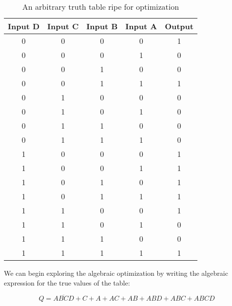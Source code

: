     \begin{table}
        \begin{tabular}{c c c c | c}
            \toprule
            Input D & Input C & Input B & Input A & Output \\
            \midrule
                0    &    0     &    0     &    0     &    1    \\
                0    &    0     &    0     &    1     &    0    \\
                0    &    0     &    1     &    0     &    0    \\
                0    &    0     &    1     &    1     &    1    \\
                0    &    1     &    0     &    0     &    0    \\
                0    &    1     &    0     &    1     &    0    \\
                0    &    1     &    1     &    0     &    0    \\
                0    &    1     &    1     &    1     &    0    \\
                1    &    0     &    0     &    0     &    1    \\
                1    &    0     &    0     &    1     &    1    \\
                1    &    0     &    1     &    0     &    1    \\
                1    &    0     &    1     &    1     &    1    \\
                1    &    1     &    0     &    0     &    1    \\
                1    &    1     &    0     &    1     &    0    \\
                1    &    1     &    1     &    0     &    0    \\
                1    &    1     &    1     &    1     &    1    \\
            \bottomrule
        \end{tabular}
        \caption[Optimization Truth Table]{An arbitrary truth table ripe for optimization}
    \end{table}

    We can begin exploring the algebraic optimization by writing the algebraic expression for the true values of the table:
    
    \begin{equation*}
        Q = \overline{ABCD} + C + A + AC + AB + ABD + ABC + ABCD 
    \end{equation*}

